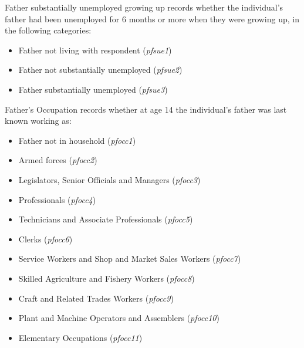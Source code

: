 \documentclass[12pt, a4paper]{article}
\begin{document}
Father substantially unemployed growing up records whether the individual’s father had been unemployed for 6 months or more when they were growing up, in the following categories:
\begin{itemize}
  \item Father not living with respondent (\textit{p\textunderscore{}fsue1})
  \item Father not substantially unemployed (\textit{p\textunderscore{}fsue2})
  \item Father substantially unemployed (\textit{p\textunderscore{}fsue3})
\end{itemize} 

Father’s Occupation records whether at age 14 the individual’s father was last known working as:
\begin{itemize}
  \item Father not in household (\textit{p\textunderscore{}focc1})
  \item Armed forces (\textit{p\textunderscore{}focc2})
  \item Legislators, Senior Officials and Managers (\textit{p\textunderscore{}focc3})
  \item Professionals (\textit{p\textunderscore{}focc4})
  \item Technicians and Associate Professionals (\textit{p\textunderscore{}focc5})
  \item Clerks (\textit{p\textunderscore{}focc6})
  \item Service Workers and Shop and Market Sales Workers (\textit{p\textunderscore{}focc7})
  \item Skilled Agriculture and Fishery Workers (\textit{p\textunderscore{}focc8})
  \item Craft and Related Trades Workers (\textit{p\textunderscore{}focc9})
  \item Plant and Machine Operators and Assemblers (\textit{p\textunderscore{}focc10})
  \item Elementary Occupations (\textit{p\textunderscore{}focc11})
\end{itemize}  
 
\end{document}
